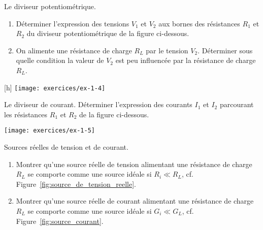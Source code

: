 \begin{exercise}{Le diviseur potentiométrique.}
\label{ex:1-4}
\begin{enumerate}
	\item Déterminer l'expression des tensions $V_1$ et $V_2$ aux bornes
	des résistances $R_1$ et $R_2$ du diviseur potentiométrique de la
	figure ci-dessous.
	\item On alimente une résistance de charge $R_L$ par le tension
	$V_2$. Déterminer sous quelle condition la valeur de $V_2$ est peu
	influencée par la résistance de charge $R_L$.
\end{enumerate}
\begin{center}[h]
	\texttt{[image: exercices/ex-1-4]}
\end{center}
\end{exercise}


\begin{exercise}{Le diviseur de courant.}
\label{ex:1-5}
Déterminer l'expression des courants $I_1$ et $I_2$ parcourant les
résistances $R_1$ et $R_2$ de la figure ci-dessous.
\begin{center}
	\texttt{[image: exercices/ex-1-5]}
\end{center}
\end{exercise}


\begin{exercise}{Sources réelles de tension et de courant.}
\label{ex:1-6}
\begin{enumerate}
\item Montrer qu'une source réelle de tension alimentant une résistance de
charge $R_L$ se comporte comme une source idéale si $R_i \ll R_L$, cf. Figure~\ref{fig:source_de_tension_reelle}.
\item Montrer qu'une source réelle de courant alimentant une résistance de
charge $R_L$ se comporte comme une source idéale si $G_i \ll G_L$, cf. Figure~\ref{fig:source_courant}.
\end{enumerate}


\end{exercise}

